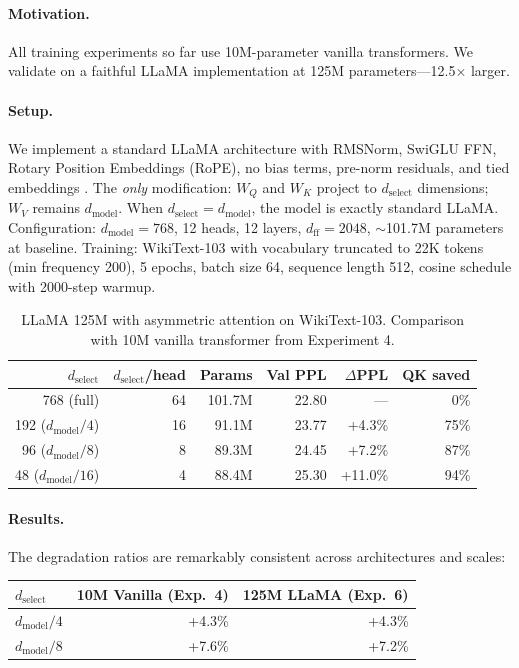 \documentclass{article} %
\newcommand{\dmodel}{d_{\text{model}}}
\newcommand{\dselect}{d_{\text{select}}}
\begin{document}
\paragraph{Motivation.}
All training experiments so far use 10M-parameter vanilla transformers. We validate on a faithful LLaMA implementation at 125M parameters---12.5$\times$ larger.

\paragraph{Setup.}
We implement a standard LLaMA architecture with RMSNorm, SwiGLU FFN, Rotary Position Embeddings (RoPE), no bias terms, pre-norm residuals, and tied embeddings \citep{touvron2023llama}. The \emph{only} modification: $W_Q$ and $W_K$ project to $\dselect$ dimensions; $W_V$ remains $\dmodel$. When $\dselect = \dmodel$, the model is exactly standard LLaMA. Configuration: $\dmodel = 768$, 12 heads, 12 layers, $d_{\text{ff}} = 2048$, $\sim$101.7M parameters at baseline. Training: WikiText-103 with vocabulary truncated to 22K tokens (min frequency 200), 5 epochs, batch size 64, sequence length 512, cosine schedule with 2000-step warmup.

\begin{table}[h]
\centering
\caption{LLaMA 125M with asymmetric attention on WikiText-103. Comparison with 10M vanilla transformer from Experiment 4.}
\label{tab:llama}
\begin{tabular}{rrrrrr}
\toprule
$\dselect$ & $\dselect$/head & Params & Val PPL & $\Delta$PPL & QK saved \\
\midrule
768 (full) & 64 & 101.7M & 22.80 & --- & 0\% \\
192 ($\dmodel/4$) & 16 & 91.1M & 23.77 & +4.3\% & 75\% \\
96 ($\dmodel/8$) & 8 & 89.3M & 24.45 & +7.2\% & 87\% \\
48 ($\dmodel/16$) & 4 & 88.4M & 25.30 & +11.0\% & 94\% \\
\bottomrule
\end{tabular}
\end{table}

\paragraph{Results.}
The degradation ratios are remarkably consistent across architectures and scales:

\begin{center}
\begin{tabular}{lrr}
\toprule
$\dselect$ & 10M Vanilla (Exp.~4) & 125M LLaMA (Exp.~6) \\
\midrule
$\dmodel/4$ & +4.3\% & +4.3\% \\
$\dmodel/8$ & +7.6\% & +7.2\% \\
\bottomrule
\end{tabular}
\end{center}
\end{document}
